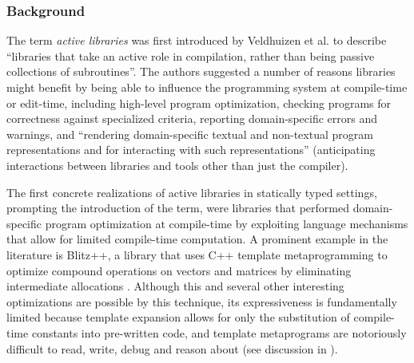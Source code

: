 \subsubsection{Background}\label{alibs}\label{background}
The term \emph{active libraries} was first introduced by Veldhuizen et al. \cite{activelibraries, active-libraries-thesis} to describe ``libraries that take an active role in compilation, rather than being passive collections of subroutines''. The authors suggested a number of reasons libraries might benefit by being able to influence the programming system at compile-time or edit-time, including high-level program optimization, checking programs for correctness against specialized criteria, reporting domain-specific errors and warnings, and ``rendering domain-specific textual and non-textual program representations and for interacting with such representations'' (anticipating interactions between libraries and tools other than just the compiler). 

The first concrete realizations of active libraries in statically typed settings, prompting the introduction of the term, were libraries that performed domain-specific program optimization at compile-time by exploiting language mechanisms that allow for limited compile-time computation. A prominent example in the literature is Blitz++, a library that uses C++ template metaprogramming to optimize compound operations on vectors and matrices by eliminating intermediate allocations \cite{veldhuizen2000blitz++}. Although this and several other interesting optimizations are possible by this technique, its expressiveness is fundamentally limited because template expansion allows for only the substitution of compile-time constants into pre-written code, and template metaprograms are notoriously difficult to read, write, debug and reason about (see discussion in \cite{Robison:2001:IEC:376656.376751}). %

